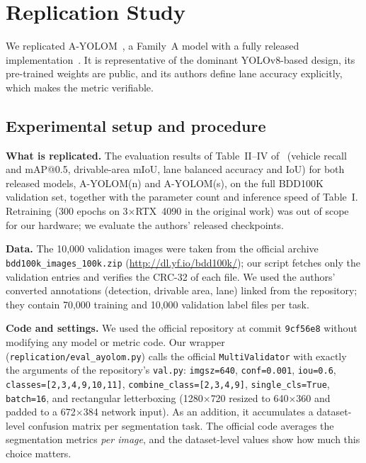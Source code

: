 \documentclass[journal,onecolumn]{IEEEtran}
\begin{document}
\section{Replication Study}\label{sec:replication}
We replicated A-YOLOM~\cite{wang2024ayolom}, a Family~A model with a fully released implementation~\cite{ayolomcode}. It is representative of the dominant YOLOv8-based design, its pre-trained weights are public, and its authors define lane accuracy explicitly, which makes the metric verifiable.

\subsection{Experimental setup and procedure}
\textbf{What is replicated.} The evaluation results of Table~II--IV of~\cite{wang2024ayolom} (vehicle recall and mAP@0.5, drivable-area mIoU, lane balanced accuracy and IoU) for both released models, A-YOLOM(n) and A-YOLOM(s), on the full BDD100K validation set, together with the parameter count and inference speed of Table~I. Retraining (300 epochs on 3$\times$RTX~4090 in the original work) was out of scope for our hardware; we evaluate the authors' released checkpoints.

\textbf{Data.} The 10{,}000 validation images were taken from the official archive \texttt{bdd100k\_images\_100k.zip} (\url{http://dl.yf.io/bdd100k/}); our script fetches only the validation entries and verifies the CRC-32 of each file. We used the authors' converted annotations (detection, drivable area, lane) linked from the repository; they contain 70{,}000 training and 10{,}000 validation label files per task. \ReplDataNote

\textbf{Code and settings.} We used the official repository at commit \texttt{9cf56e8} without modifying any model or metric code. Our wrapper (\texttt{replication/eval\_ayolom.py}) calls the official \texttt{MultiValidator} with exactly the arguments of the repository's \texttt{val.py}: \texttt{imgsz=640}, \texttt{conf=0.001}, \texttt{iou=0.6}, \texttt{classes=[2,3,4,9,10,11]}, \texttt{combine\_class=[2,3,4,9]}, \texttt{single\_cls=True}, \texttt{batch=16}, and rectangular letterboxing (1280$\times$720 resized to 640$\times$360 and padded to a 672$\times$384 network input). As an addition, it accumulates a dataset-level confusion matrix per segmentation task. The official code averages the segmentation metrics \emph{per image}, and the dataset-level values show how much this choice matters.
\end{document}
